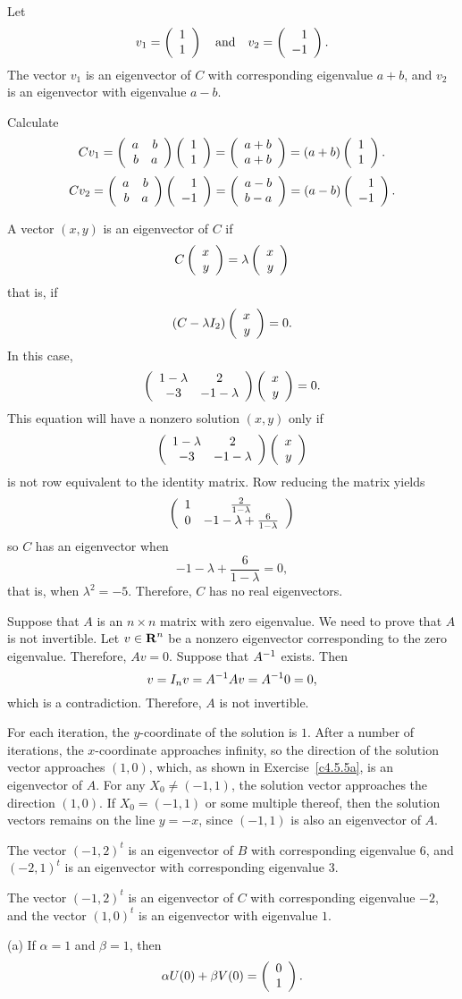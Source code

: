 \documentclass{ximera}
\begin{document}
\ans Let
\[ v_1 = \left(\begin{array}{r} 1 \\ 1\end{array}\right) \quad\mbox{and}\quad v_2 = \left(\begin{array}{r} 1 \\ -1\end{array}\right). \]
The vector $v_1$ is an eigenvector of $C$ with corresponding
eigenvalue $a + b$, and $v_2$ is an eigenvector with eigenvalue $a - b$.

\soln Calculate
\[ Cv_1 = \left(\begin{array}{rr} a & b\\ b &a\end{array}\right)\left(\begin{array}{r} 1 \\ 1\end{array}\right) = \left(\begin{array}{r} a + b \\ a + b\end{array}\right) =
(a + b)\left(\begin{array}{r} 1 \\ 1\end{array}\right). \]
\[ Cv_2 = \left(\begin{array}{rr} a & b\\ b &a\end{array}\right)\left(\begin{array}{r} 1 \\ -1\end{array}\right) = \left(\begin{array}{r} a - b \\ b - a\end{array}\right) =
(a - b)\left(\begin{array}{r} 1 \\ -1\end{array}\right). \]


A vector $(x,y)$ is an eigenvector of $C$ if
\[ C\left(\begin{array}{r} x \\ y\end{array}\right) = \lambda\left(\begin{array}{r} x \\ y\end{array}\right) \]
that is, if
\[ (C - \lambda I_2)\left(\begin{array}{r} x \\ y\end{array}\right) = 0. \]
In this case,
\[ \left(\begin{array}{cc} 1 - \lambda & 2\\ -3 &-1 - \lambda\end{array}\right)
\left(\begin{array}{r} x \\ y\end{array}\right) = 0. \]
This equation will have a nonzero solution $(x,y)$ only if
\[ \left(\begin{array}{cc} 1 - \lambda & 2\\ -3 &-1 - \lambda\end{array}\right)\left(\begin{array}{r} x \\ y\end{array}\right) \]
is not row equivalent to the identity matrix.
Row reducing the matrix yields
\[ \left(\begin{array}{cc} 1 & \frac{2}{1 - \lambda}\\ 0 &-1 - \lambda + \frac{6}{1-\lambda}\end{array}\right) \]
so $C$ has an eigenvector when
\[ -1 - \lambda + \frac{6}{1-\lambda} = 0, \]
that is, when $\lambda^2 = -5$.  Therefore, $C$ has no real 
eigenvectors.

Suppose that $A$ is an $n\times n$ matrix with zero eigenvalue.  We need to
prove that $A$ is not invertible.  Let $v\in\mbox{$\bf{R}$}^n$ be a nonzero 
eigenvector corresponding to the zero eigenvalue.  Therefore, $Av=0$. 
Suppose that $A^{-1}$ exists.  Then
\[
v = I_nv = A^{-1} Av = A^{-1} 0 = 0,
\]
which is a contradiction.  Therefore, $A$ is not invertible.

For each iteration, the $y$-coordinate of the solution is $1$.  After a
number of iterations, the $x$-coordinate approaches infinity, so the
direction of the solution vector approaches $(1,0)$, which, as shown
in Exercise~\ref{c4.5.5a}, is an eigenvector of $A$.  For any $X_0
\neq (-1,1)$, the solution vector approaches the direction
$(1,0)$.  If $X_0 = (-1,1)$ or some multiple thereof, then the solution
vectors remains on the line $y = -x$, since $(-1,1)$ is also an
eigenvector of $A$.

 The vector $(-1,2)^t$ is an eigenvector of $B$ with
corresponding eigenvalue $6$, and $(-2,1)^t$ is an eigenvector with
corresponding eigenvalue $3$.

\newpage
{} The vector $(-1,2)^t$ is an eigenvector of $C$ with
corresponding eigenvalue $-2$, and the vector $(1,0)^t$ is an eigenvector
with eigenvalue $1$.


(a) \ans If $\alpha = 1$ and $\beta = 1$, then
\[
\alpha U(0) + \beta V(0) = \left(\begin{array}{r} 0 \\ 1\end{array}\right). 
\]
\end{document}

